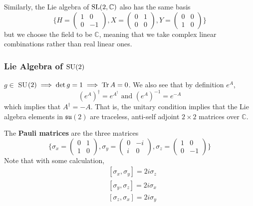     Similarly, the Lie algebra of $\SL(2, \mathbb{C})$ also has the same basis 
    \begin{equation}
      \bigg\{ H = \begin{pmatrix}
      1&0\\0&-1
      \end{pmatrix}, X = \begin{pmatrix}
      0&1\\0&0
      \end{pmatrix}, Y = \begin{pmatrix}
      0&0\\1&0
      \end{pmatrix}\bigg\}
    \end{equation}
    but we choose the field to be $\mathbb{C}$, meaning that we take complex linear combinations rather than real linear ones. 

  \subsubsection[Lie Algebra of SU(2)]{Lie Algebra of \(\SU(2)\)}

    $g \in $ SU$(2) \implies \det{g} = 1 \implies \Tr{A} = 0$. We also see that by definition $e^A$, 
    \begin{equation}
      (e^A)^\dagger = e^{A^\dagger} \text{ and } (e^A)^{-1} = e^{-A}
    \end{equation}
    which implies that $A^\dagger = - A$. That is, the unitary condition implies that the Lie algebra elements in $\mathfrak{su}(2)$ are traceless, anti-self adjoint $2 \times 2$ matrices over $\mathbb{C}$. 

    \begin{definition}
      The \textbf{Pauli matrices} are the three matrices
      \begin{equation}
        \bigg\{ \sigma_x = \begin{pmatrix}
        0&1\\1&0
        \end{pmatrix}, \sigma_y = \begin{pmatrix}
        0&-i\\i&0
        \end{pmatrix}, \sigma_z = \begin{pmatrix}
        1&0\\0&-1
        \end{pmatrix}\bigg\}
      \end{equation}
      Note that with some calculation, 
      \begin{align*}
        & [\sigma_x, \sigma_y] = 2 i \sigma_z \\
        & [\sigma_y, \sigma_z] = 2 i \sigma_x \\
        & [\sigma_z, \sigma_x] = 2 i \sigma_y
      \end{align*}
    \end{definition}

